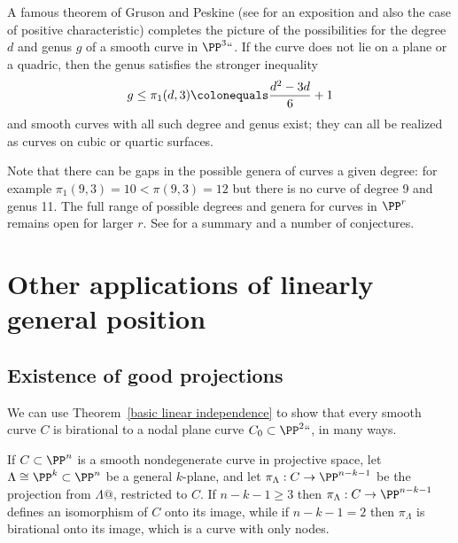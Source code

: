 \begin{fact}
A famous theorem of Gruson and Peskine \citeyear{MR0690647} (see
%
%
\cite{MR0689536} for an exposition and also the case of
positive
characteristic) completes the picture of the
possibilities for the degree $d$ and  genus $g$  of a smooth curve in
$\PP^3` `$. If the curve does not lie on a plane or a quadric, then the
genus satisfies the stronger inequality
$$
g\leq 
\pi_1(d,3)
\colonequals  \frac{d^2-3d}{6} +1
$$
and smooth curves with all such degree and genus exist; they can all be
%
realized as curves
on cubic or quartic surfaces.

Note that there can be gaps in the possible genera of curves a given
degree: for example  $\pi_1(9,3) = 10<\pi(9,3) =12$ but there is
no curve of degree 9 and genus 11.
The full range of possible degrees and genera for curves in $\PP^r$
remains open for larger $r$.
See 
\cite{MR0589222} for a summary and a number of
conjectures.
\end{fact}


\section{Other applications of linearly general position}
\label{projection section}\label{good projections}

\subsection*{Existence of good projections}

We can use Theorem~\ref{basic linear independence} to show that every
%
smooth curve $C$ is 
birational
%
%
to a 
nodal plane curve
$C_0 \subset \PP^2``$, in many ways.

\begin{proposition}\label{nodal projection}
If $C \subset \PP^n$ is a smooth nondegenerate curve in projective space,
let $\Lambda \cong \PP^{k} \subset \PP^n$ be a general $k$-plane, and let
$\pi_\Lambda : C \to \PP^{n-k-1}$ be the projection from $\Lambda@$,
restricted to $C$. If  $n-k-1 \geq 3$
then
$\pi_\Lambda: C \to \PP^{n-k-1}$ defines an isomorphism of $C$ onto
its image, while if $n-k-1 = 2$ then $\pi_\Lambda$
is birational onto its image, which is a curve with only nodes.
\end{proposition}

